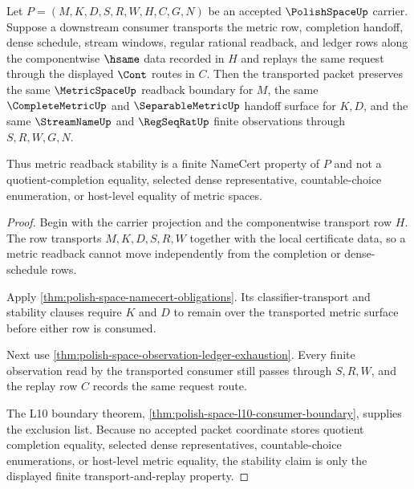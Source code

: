 \begin{theorem}
\label{thm:polish-space-metric-readback-stability}
Let $P=(M,K,D,S,R,W,H,C,G,N)$ be an accepted $\PolishSpaceUp$ carrier. Suppose a downstream consumer transports the metric row, completion handoff, dense schedule, stream windows, regular rational readback, and ledger rows along the componentwise $\hsame$ data recorded in $H$ and replays the same request through the displayed $\Cont$ routes in $C$. Then the transported packet preserves the same $\MetricSpaceUp$ readback boundary for $M$, the same $\CompleteMetricUp$ and $\SeparableMetricUp$ handoff surface for $K,D$, and the same $\StreamNameUp$ and $\RegSeqRatUp$ finite observations through $S,R,W,G,N$.

Thus metric readback stability is a finite NameCert property of $P$ and not a quotient-completion equality, selected dense representative, countable-choice enumeration, or host-level equality of metric spaces.
\end{theorem}
\begin{proof}
Begin with the carrier projection and the componentwise transport row $H$. The row transports $M,K,D,S,R,W$ together with the local certificate data, so a metric readback cannot move independently from the completion or dense-schedule rows.

Apply \autoref{thm:polish-space-namecert-obligations}. Its classifier-transport and stability clauses require $K$ and $D$ to remain over the transported metric surface before either row is consumed.

Next use \autoref{thm:polish-space-observation-ledger-exhaustion}. Every finite observation read by the transported consumer still passes through $S,R,W$, and the replay row $C$ records the same request route.

The L10 boundary theorem, \autoref{thm:polish-space-l10-consumer-boundary}, supplies the exclusion list. Because no accepted packet coordinate stores quotient completion equality, selected dense representatives, countable-choice enumerations, or host-level metric equality, the stability claim is only the displayed finite transport-and-replay property.
\end{proof}

